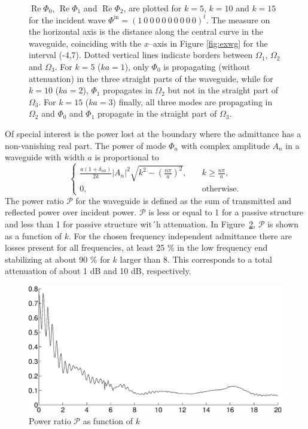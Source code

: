 \documentclass[numreferences]{kluwer}
\providecommand{\abs}[1]{\left\lvert#1\right\rvert}
\renewcommand{\Phi}{\varPhi}
\renewcommand{\Re}{\operatorname{Re}}
\renewcommand{\vec}[1]{\bm{#1}}
\renewcommand{\Phi}{\varPhi}
\newcommand{\Phiin}{\vec\Phi^{\text{in}}}
\begin{document}
\begin{figure}[htb]
  \caption{$\Re\Phi_0$, $\Re\Phi_1$ and $\Re\Phi_2$, are plotted for $k=5$, $k=10$ and
    $k=15$ for the incident wave $\Phiin=(1\ 0\ 0\ 0\ 0\ 0\ 0\ 0\ 0\
    0)^t$. The measure on the horizontal axis is the distance along
    the central curve in the waveguide, coinciding with the $x$--axis
    in Figure \ref{fig:exwg} for the interval (-4,7). Dotted vertical
    lines indicate borders between $\Omega_1$, $\Omega_2$ and
    $\Omega_3$. For $k=5$ ($ka=1$), only $\Phi_0$ is propagating
    (without attenuation) in the three straight parts of the
    waveguide, while for $k=10$ ($ka=2$), $\Phi_1$ propagates in
    $\Omega_2$ but not in the straight part of $\Omega_3$. For $k=15$
    ($ka=3$) finally, all three modes are propagating in $\Omega_2$
    and $\Phi_0$ and $\Phi_1$ propagate in the straight part of
    $\Omega_3$.}
  \label{fig:phi}
\end{figure}

Of special interest is the power lost at the boundary where the
admittance has a non-vanishing real part. The power of mode $\Phi_n$
with complex amplitude $A_n$ in a waveguide with width $a$ is proportional to
\begin{equation}\label{eq:power}
  \begin{cases}
    \frac{a(1+\delta_{n0})}{2k}\abs{A_n}^2
    \sqrt{k^2-\left(\frac{n\pi}a\right)^2},\quad&
    k\ge\frac{n\pi}a,\\
    0,&\text{otherwise}.
  \end{cases}
\end{equation}
The power ratio $\mathcal P$ for the waveguide is defined as the sum of transmitted and reflected power over incident power. $\mathcal P$ is less or equal to 1 for a passive structure and less than 1 for passive structure wit´h attenuation. In Figure~\ref{fig:ekvot}, $\mathcal P$ is shown as a function of $k$. For the chosen frequency independent admittance there are losses present for all frequencies, at least 25 \% in the low frequency end stabilizing at about 90 \% for $k$ larger than 8. This corresponds to a total attenuation of about 1 dB and 10 dB, respectively.

\begin{figure}[htb]
  \centering
  \includegraphics[scale=0.3]{ekvot}
  \caption{Power ratio $\mathcal P$ as function of $k$}
  \label{fig:ekvot}
\end{figure}
\end{document}
